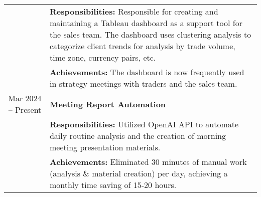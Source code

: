 \documentclass[uplatex,a4j,10.5pt,dvipdfmx]{jsarticle}
\begin{document}
\begin{longtable}{|c|p{14cm}|}
	                                      & {\small \textbf{Responsibilities:}} Responsible for creating and maintaining a Tableau dashboard as a support tool for the sales team. The dashboard uses clustering analysis to categorize client trends for analysis by trade volume, time zone, currency pairs, etc. \\
	                                      & {\small \textbf{Achievements:}} The dashboard is now frequently used in strategy meetings with traders and the sales team.                                                                                                                                              \\
	\hline
	Mar 2024 -- Present                   & \textbf{\textbullet{} Meeting Report Automation}                                                                                                                                                                                                                \\
	                                      & {\small \textbf{Responsibilities:}} Utilized OpenAI API to automate daily routine analysis and the creation of morning meeting presentation materials.                                                                                                                  \\
	                                      & {\small \textbf{Achievements:}} Eliminated 30 minutes of manual work (analysis \& material creation) per day, achieving a monthly time saving of 15-20 hours.                                                                                                           \\
	\hline
\end{longtable}
\end{document}
